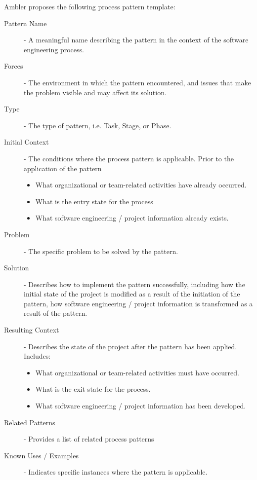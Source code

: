 \documentclass[12pt letter]{report}
\begin{document}
Ambler proposes the following process pattern template:
\begin{description}
  \item[Pattern Name]  - A meaningful name describing the pattern in the context of the software engineering process.
  \item[Forces] - The environment in which the pattern encountered, and issues that make the problem visible and may affect its solution.
  \item[Type] - The type of pattern, i.e. Task, Stage, or Phase.
  \item[Initial Context] - The conditions where the process pattern is applicable. Prior to the application of the pattern
        \begin{itemize}
          \item What organizational or team-related activities have already occurred.
          \item What is the entry state for the process
          \item What software engineering / project information already exists.
        \end{itemize}
  \item[Problem] - The specific problem to be solved by the pattern.
  \item[Solution] - Describes how to implement the pattern successfully, including how the initial state of the project is modified as a result of the initiation of the pattern, how software engineering / project information is transformed as a result of the pattern.
  \item[Resulting Context] - Describes the state of the project after the pattern has been applied. Includes:
        \begin{itemize}
          \item What organizational or team-related activities must have occurred.
          \item What is the exit state for the process.
          \item What software engineering / project information has been developed.
        \end{itemize}
  \item[Related Patterns] - Provides a list of related process patterns
  \item[Known Uses / Examples] - Indicates specific instances where the pattern is applicable.
\end{description}
\end{document}
